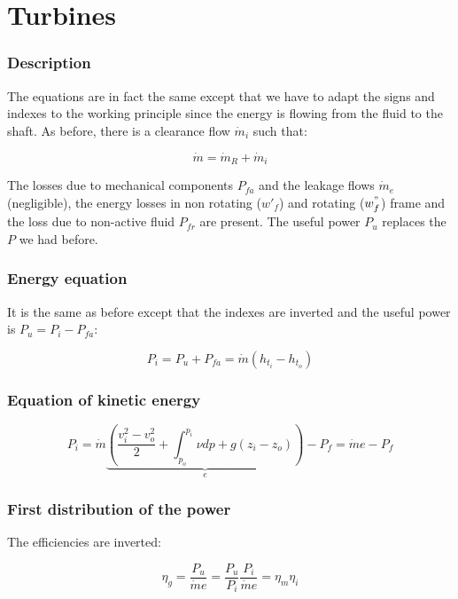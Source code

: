 \section{Turbines}
\subsubsection{Description}
The equations are in fact the same except that we have to adapt the signs and indexes to the working principle since the energy is flowing from the fluid to the shaft. As before, there is a clearance flow $\dot{m}_i$ such that: 

\begin{equation}
\dot{m} = \dot{m}_R + \dot{m}_i
\end{equation}

The losses due to mechanical components $P_{fa}$ and the leakage flows $\dot{m}_e$ (negligible), the energy losses in non rotating ($w'_f$) and rotating ($w^"_f$) frame and the loss due to non-active fluid $P_{fr}$ are present. The useful power $P_u$ replaces the $P$ we had before. 

\subsubsection{Energy equation}
It is the same as before except that the indexes are inverted and the useful power is $P_u = P_i - P_{fa}$:

\begin{equation}
P_i = P_u + P_{fa} = \dot{m} (h_{t_i} - h_{t_o})
\end{equation} 

\subsubsection{Equation of kinetic energy}
\begin{equation}
P_i = \dot{m} \underbrace{\left( \frac{v_i^2-v_o^2}{2} + \int _{p_o}^{p_i} \nu dp + g(z_i - z_o)\right)}_{e} - P_f = \dot{m} e - P_f
\end{equation}

\subsubsection{First distribution of the power}
The efficiencies are inverted: 

\begin{equation}
\eta _g = \frac{P_u}{\dot{m}e} = \frac{P_u}{P_i}\frac{P_i}{\dot{m}e} = \eta _m \eta _i
\end{equation}

